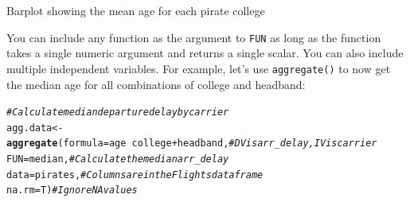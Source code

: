 \documentclass{tufte-book}\usepackage[]{graphicx}\usepackage[]{color}
\makeatletter
\def\maxwidth{ %
  \ifdim\Gin@nat@width>\linewidth
    \linewidth
  \else
    \Gin@nat@width
  \fi
}
\newcommand{\hlcom}[1]{\textcolor[rgb]{0.678,0.584,0.686}{\textit{#1}}}%
\newcommand{\hlopt}[1]{\textcolor[rgb]{0,0,0}{#1}}%
\newcommand{\hlstd}[1]{\textcolor[rgb]{0.345,0.345,0.345}{#1}}%
\newcommand{\hlkwb}[1]{\textcolor[rgb]{0.69,0.353,0.396}{#1}}%
\newcommand{\hlkwc}[1]{\textcolor[rgb]{0.333,0.667,0.333}{#1}}%
\newcommand{\hlkwd}[1]{\textcolor[rgb]{0.737,0.353,0.396}{\textbf{#1}}}%
\newenvironment{kframe}{%
 \def\at@end@of@kframe{}%
 \ifinner\ifhmode%
  \def\at@end@of@kframe{\end{minipage}}%
  \begin{minipage}{\columnwidth}%
 \fi\fi%
 \def\FrameCommand##1{\hskip\@totalleftmargin \hskip-\fboxsep
 \colorbox{shadecolor}{##1}\hskip-\fboxsep
     \hskip-\linewidth \hskip-\@totalleftmargin \hskip\columnwidth}%
 \MakeFramed {\advance\hsize-\width
   \@totalleftmargin\z@ \linewidth\hsize
   \@setminipage}}%
 {\par\unskip\endMakeFramed%
 \at@end@of@kframe}
\newenvironment{knitrout}{}{} %
\makeatother
\begin{document}
\begin{footnotesize}
\begin{marginfigure}
\caption{Barplot showing the mean age for each pirate college}
\label{fig:barplot}
\end{marginfigure}

You can include any function as the argument to \texttt{FUN} as long as the function takes a single numeric argument and returns a single scalar. You can also include multiple independent variables. For example, let's use \texttt{aggregate()} to now get the median age for all combinations of college and headband:

\begin{footnotesize}
\begin{knitrout}
\color{fgcolor}\begin{kframe}
\begin{alltt}
\hlcom{# Calculate median departure delay by carrier}
\hlstd{agg.data} \hlkwb{<-} \hlkwd{aggregate}\hlstd{(}\hlkwc{formula} \hlstd{= age} \hlopt{~} \hlstd{college} \hlopt{+} \hlstd{headband,} \hlcom{# DV is arr_delay, IV is carrier}
            \hlkwc{FUN} \hlstd{= median,} \hlcom{# Calculate the median arr_delay}
            \hlkwc{data} \hlstd{= pirates,} \hlcom{# Columns are in the Flights dataframe}
            \hlkwc{na.rm} \hlstd{= T)} \hlcom{# Ignore NA values}
\end{alltt}
\end{kframe}
\end{knitrout}


\end{footnotesize}
\end{footnotesize}
\end{document}
